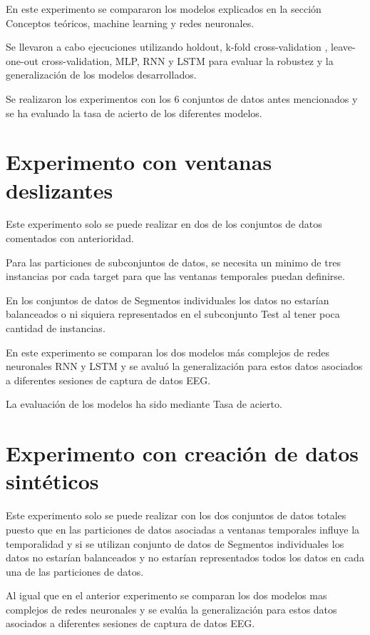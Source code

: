 En este experimento se compararon los modelos explicados en la sección Conceptos teóricos, machine learning y redes neuronales.

Se llevaron a cabo ejecuciones utilizando holdout, k-fold cross-validation , leave-one-out cross-validation, MLP, RNN y LSTM para evaluar la robustez y la generalización de los modelos desarrollados.

Se realizaron los experimentos con los 6 conjuntos de datos antes mencionados y se ha evaluado la tasa de acierto de los diferentes modelos.


\section{Experimento con ventanas deslizantes}

Este experimento solo se puede realizar en dos de los conjuntos de datos comentados con anterioridad.

Para las particiones de subconjuntos de datos, se necesita un minimo de tres instancias por cada target para que las ventanas temporales puedan definirse.

En los conjuntos de datos de Segmentos individuales los datos no estarían balanceados o ni siquiera representados en el subconjunto Test al tener poca cantidad de instancias.

En este experimento se comparan los dos modelos más complejos de redes neuronales RNN y LSTM y se avaluó la generalización para estos datos asociados a diferentes sesiones de captura de datos EEG.

La evaluación de los modelos ha sido mediante Tasa de acierto.


\section{Experimento con creación de datos sintéticos}

Este experimento solo se puede realizar con los dos conjuntos de datos totales puesto que en las particiones de datos asociadas a ventanas temporales influye la temporalidad y si se utilizan conjunto de datos de Segmentos individuales los datos no estarían balanceados y no estarían representados todos los datos en cada una de las particiones de datos.

Al igual que en el anterior experimento se comparan los dos modelos mas complejos de redes neuronales y se evalúa la generalización para estos datos asociados a diferentes sesiones de captura de datos EEG.

